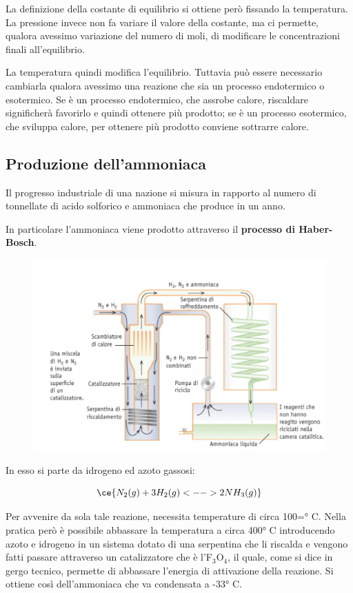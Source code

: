 \vspace{0.2cm}\normalsize La definizione della costante di equilibrio si ottiene però fissando la temperatura. La pressione invece non fa variare il valore della costante, ma ci permette, qualora avessimo variazione del numero di moli, di modificare le concentrazioni finali all'equilibrio.

La temperatura quindi modifica l'equilibrio. Tuttavia può essere necessario cambiarla qualora avessimo una reazione che sia un processo endotermico o esotermico. Se è un processo endotermico, che assrobe calore, riscaldare significherà favorirlo e quindi ottenere più prodotto; se è un processo esotermico, che sviluppa calore, per ottenere più prodotto conviene sottrarre calore.
\subsection{Produzione dell'ammoniaca}
Il progresso industriale di una nazione si misura in rapporto al numero di tonnellate di acido solforico e ammoniaca che produce in un anno.

In particolare l'ammoniaca viene prodotto attraverso il \textbf{processo di Haber-Bosch}.

\vspace{-1cm}\begin{figure}[htp]
    \centering
    \includegraphics[width=14cm]{immagini/produzione_ammoniaca.png}
\end{figure}

In esso si parte da idrogeno ed azoto gassosi:

$$\ce{N_2(g) + 3H_2(g) <--> 2NH_3(g)}$$

Per avvenire da sola tale reazione, necessita temperature di circa 100=° C. Nella pratica però è possibile abbassare la temperatura a circa 400° C introducendo azoto e idrogeno in un sistema dotato di una serpentina che li riscalda e vengono fatti passare attraverso un catalizzatore che è l'F$_3$O$_4$, il quale, come si dice in gergo tecnico, permette di abbassare l'energia di attivazione della reazione. Si ottiene così dell'ammoniaca che va condensata a -33° C.

